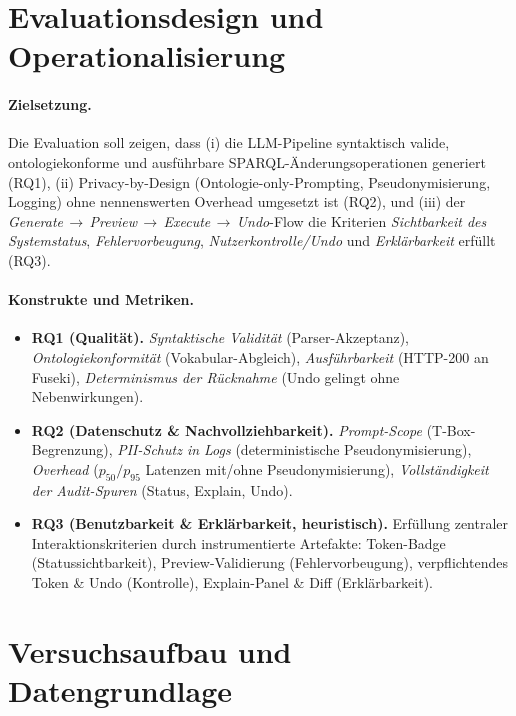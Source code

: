 \section{Evaluationsdesign und Operationalisierung}
\label{sec:evaluationsdesign}

\paragraph{Zielsetzung.}
Die Evaluation soll zeigen, dass (i) die LLM-Pipeline syntaktisch valide, ontologiekonforme und ausführbare SPARQL-Änderungsoperationen generiert (RQ1), (ii) Privacy-by-Design (Ontologie-only-Prompting, Pseudonymisierung, Logging) ohne nennenswerten Overhead umgesetzt ist (RQ2), und (iii) der \emph{Generate}\,$\rightarrow$\,\emph{Preview}\,$\rightarrow$\,\emph{Execute}\,$\rightarrow$\,\emph{Undo}-Flow die Kriterien \emph{Sichtbarkeit des Systemstatus}, \emph{Fehlervorbeugung}, \emph{Nutzerkontrolle/Undo} und \emph{Erklärbarkeit} erfüllt (RQ3).

\paragraph{Konstrukte und Metriken.}
\begin{itemize}
  \item \textbf{RQ1 (Qualität).} \emph{Syntaktische Validität} (Parser-Akzeptanz), \emph{Ontologiekonformität} (Vokabular-Abgleich), \emph{Ausführbarkeit} (HTTP-200 an Fuseki), \emph{Determinismus der Rücknahme} (Undo gelingt ohne Nebenwirkungen).
  \item \textbf{RQ2 (Datenschutz \& Nachvollziehbarkeit).} \emph{Prompt-Scope} (T-Box-Begrenzung), \emph{PII-Schutz in Logs} (deterministische Pseudonymisierung), \emph{Overhead} (\(p_{50}/p_{95}\) Latenzen mit/ohne Pseudonymisierung), \emph{Vollständigkeit der Audit-Spuren} (Status, Explain, Undo).
  \item \textbf{RQ3 (Benutzbarkeit \& Erklärbarkeit, heuristisch).} Erfüllung zentraler Interaktionskriterien durch instrumentierte Artefakte: Token-Badge (Statussichtbarkeit), Preview-Validierung (Fehlervorbeugung), verpflichtendes Token \& Undo (Kontrolle), Explain-Panel \& Diff (Erklärbarkeit).
\end{itemize}

\section{Versuchsaufbau und Datengrundlage}
\label{sec:versuchsaufbau}


